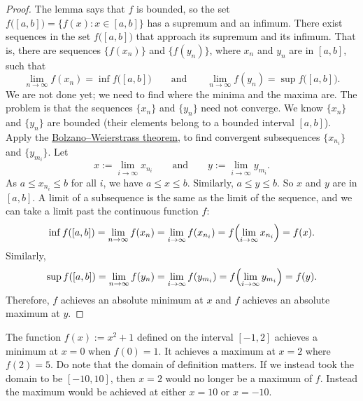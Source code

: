 \begin{proof}
The lemma says that $f$ is bounded, so
the set $f\bigl([a,b]\bigr) = \bigl\{ f(x) : x \in [a,b] \bigr\}$ has a supremum and an infimum.
There exist sequences
in the set $f\bigl([a,b]\bigr)$ that approach its supremum and its infimum.
That is, there are sequences
$\bigl\{ f(x_n) \bigr\}$ and $\bigl\{ f(y_n) \bigr\}$, where $x_n$ and $y_n$ are in $[a,b]$,
such that
\begin{equation*}
\lim_{n\to\infty} f(x_n) = \inf f\bigl([a,b]\bigr) \qquad \text{and} \qquad
\lim_{n\to\infty} f(y_n) = \sup f\bigl([a,b]\bigr).
\end{equation*}
We are not done yet; we need to find where the minima and the maxima are.
The problem is that the sequences $\{ x_n \}$ and $\{ y_n \}$ need not
converge.
We know $\{ x_n \}$ and $\{ y_n \}$ are bounded
(their elements belong to a bounded interval $[a,b]$).
Apply the 
\hyperref[thm:bwseq]{Bolzano--Weierstrass theorem},
to find
convergent subsequences
$\{ x_{n_i} \}$ and 
$\{ y_{m_i} \}$.  Let
\begin{equation*}
x := \lim_{i\to\infty} x_{n_i}
\qquad \text{and} \qquad
y := \lim_{i\to\infty} y_{m_i}.
\end{equation*}
As $a \leq x_{n_i} \leq b$ for all $i$, we have $a \leq x \leq b$.
Similarly, $a \leq y \leq b$.  So $x$ and $y$ are in $[a,b]$.
A limit of a subsequence is the same as the limit of the
sequence, and we can take a limit past the continuous function $f$:
\begin{equation*}
\inf f([a,b]) = \lim_{n\to\infty} f(x_n)
= \lim_{i\to\infty} f(x_{n_i}) = 
f \Bigl( \lim_{i\to\infty} x_{n_i} \Bigr) = f(x) .
\end{equation*}
Similarly,
\begin{equation*}
\sup f([a,b]) = \lim_{n\to\infty} f(y_n)
= \lim_{i\to\infty} f(y_{m_i}) = 
f \Bigl( \lim_{i\to\infty} y_{m_i} \Bigr) = f(y) .
\end{equation*}
Therefore, $f$ achieves an absolute minimum at $x$ and
$f$ achieves an absolute maximum at $y$.
\end{proof}

\begin{example}
The function $f(x) := x^2+1$ defined on the interval $[-1,2]$ achieves a minimum
at $x=0$ when $f(0) = 1$.  It achieves a maximum at $x=2$ where $f(2) = 5$.
Do note that the domain of definition matters.  If we instead took the domain
to be $[-10,10]$, then $x=2$ would no longer be a maximum of $f$.  Instead
the maximum would be achieved at either $x=10$ or $x=-10$.
\end{example}

